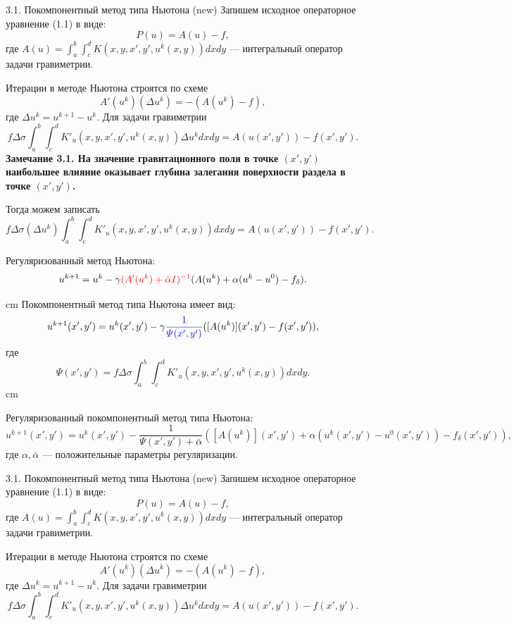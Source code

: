 \documentclass[10pt,pdf, mathserif, hyperref={unicode}]{beamer}
\begin{document}
\begin{frame}{3.1. Покомпонентный метод типа Ньютона (new)}
	Запишем исходное операторное уравнение (1.1) в виде:
	$$P(u)=A(u)-f,$$
	где $A(u)=\int_{a}^{b}\int_{c}^{d}K(x,y, x',y',u^k(x,y))dxdy$ --- интегральный оператор задачи гравиметрии.
	
	Итерации в методе Ньютона строятся по схеме
	$$A'(u^k)(\Delta u^k)=-(A(u^k)-f),$$ где $\Delta u^k=u^{k+1}-u^k$.
	Для задачи гравиметрии
	$$f\Delta\sigma\int_{a}^{b}\int_{c}^{d}K'_u(x,y, x',y',u^k(x,y))\Delta u^k dxdy=A(u(x',y'))-f(x',y').$$
\textbf{\color{blue} Замечание 3.1. На значение гравитационного поля в точке $(x',y')$ наибольшее влияние оказывает глубина залегания поверхности раздела в точке $(x',y')$.} 

Тогда можем записать
	$$f\Delta\sigma(\Delta u^k)\int_{a}^{b}\int_{c}^{d}K'_u(x,y, x',y',u^k(x,y)) dxdy=A(u(x',y'))-f(x',y').$$
\end{frame}

\begin{frame}{}
	 Регуляризованный метод Ньютона:
	$$ u^{k+1}=u^k-\gamma{\color{red}(A'(u^k)+\bar\alpha I)^{-1}}(A(u^k)+\alpha(u^k-u^0)-f_\delta).$$

	 cm
	Покомпонентный метод типа Ньютона имеет вид:
	$$u^{k+1}(x',y')=u^k(x',y')-\gamma{\color{blue}\frac{1}{\varPsi(x',y')}}([A(u^k)](x',y')-f(x',y')),$$
	где $$\varPsi(x',y')=f\Delta\sigma\int_{a}^{b}\int_{c}^{d}K'_u(x,y, x',y',u^k(x,y)) dxdy.$$
	 cm

	Регуляризованный покомпонентный метод типа Ньютона:
	$$u^{k+1}(x',y')=u^k(x',y')-\frac{1}{\varPsi(x',y')+\bar{\alpha}}([A(u^k)](x',y')+\alpha (u^k(x',y')-u^0(x',y'))-f_\delta(x',y')),$$
	где $\alpha, \bar{\alpha}$ --- положительные параметры регуляризации.
	\let\thefootnote\relax\let\thefootnote\relax{}
\end{frame}

\begin{frame}{3.1. Покомпонентный метод типа Ньютона (new)}
	Запишем исходное операторное уравнение (1.1) в виде:
	$$P(u)=A(u)-f,$$
	где $A(u)=\int_{a}^{b}\int_{c}^{d}K(x,y, x',y',u^k(x,y))dxdy$ --- интегральный оператор задачи гравиметрии.
	
	Итерации в методе Ньютона строятся по схеме
	$$A'(u^k)(\Delta u^k)=-(A(u^k)-f),$$ где $\Delta u^k=u^{k+1}-u^k$.
	Для задачи гравиметрии
	$$f\Delta\sigma\int_{a}^{b}\int_{c}^{d}K'_u(x,y, x',y',u^k(x,y))\Delta u^k dxdy=A(u(x',y'))-f(x',y').$$
\end{frame}
\end{document}
